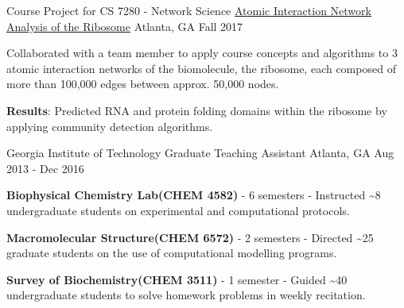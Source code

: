 \begin{cventries}
  \cventry
    {Course Project for CS 7280 - Network Science} %
    {\href{https://nbviewer.jupyter.org/github/NicholasAKovacs/CS7280_Ribosomal_Network_Analysis/blob/master/Jupyter_Notebooks/EsCo_complete_and_SaCe_rPro_analysis/Interaction_Network_Analysis_of_Complete_Ecoli_ribosome_and_Yeast_LSU_rProteins.ipynb}{Atomic Interaction Network Analysis of the Ribosome}} %
    {Atlanta, GA} %
    {Fall 2017} %
    {
      \begin{cvitems} %
      	\item Collaborated with a team member to apply course concepts and algorithms to 3 atomic interaction networks of the biomolecule, the ribosome, each composed of more than 100,000 edges between approx. 50,000 nodes. 
      	\item {\bf Results}: Predicted RNA and protein folding domains within the ribosome by applying community detection algorithms.
      \end{cvitems}
    }

  \cventry
    {Georgia Institute of Technology} %
    {Graduate Teaching Assistant} %
    {Atlanta, GA} %
    {Aug 2013 - Dec 2016} %
    {
      \begin{cvitems} %
        \item {\textbf{Biophysical Chemistry Lab{\scriptsize (CHEM 4582)}} - 6 semesters - Instructed \textasciitilde8 undergraduate students on experimental and computational protocols.}
        \item {\textbf{Macromolecular Structure{\scriptsize (CHEM 6572)}} - 2 semesters - Directed \textasciitilde25 graduate students on the use of computational modelling programs.}
        \item {\textbf{Survey of Biochemistry{\scriptsize (CHEM 3511)}} - 1 semester - Guided \textasciitilde40 undergraduate students to solve homework problems in weekly recitation.}
      \end{cvitems}
    }


\end{cventries}
